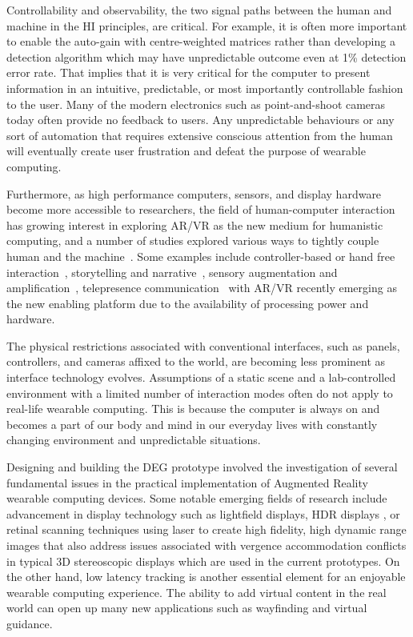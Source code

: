 Controllability and observability, the two signal paths between the human and machine in the HI principles, are critical. For example, it is often more important to enable the auto-gain with centre-weighted matrices rather than developing a detection algorithm which may have unpredictable outcome even at 1\% detection error rate. That implies that it is very critical for the computer to present information in an intuitive, predictable, or most importantly controllable fashion to the user. Many of the modern electronics such as point-and-shoot cameras today often provide no feedback to users. Any unpredictable behaviours or any sort of automation that requires extensive conscious attention from the human will eventually create user frustration and defeat the purpose of wearable computing.

Furthermore, as high performance computers, sensors, and display hardware become more accessible to researchers, the field of human-computer interaction has growing interest in exploring AR/VR as the new medium for humanistic computing, and a number of studies explored various ways to tightly couple human and the machine~\cite{khundam2015first, biocca2013communication, wright2014using, henrikson2016multi}. Some examples include controller-based or hand free interaction~\cite{Arora:vrSketching:2017}, storytelling and narrative~\cite{henrikson2016multi}, sensory augmentation and amplification~\cite{wright2014using}, telepresence communication~\cite{biocca2013communication,earnshaw2014virtual} with AR/VR recently emerging as the new enabling platform due to the availability of processing power and hardware.

The physical restrictions associated with conventional interfaces, such as panels, controllers, and cameras affixed to the world, are becoming less prominent as interface technology evolves. Assumptions of a static scene and a lab-controlled environment with a limited number of interaction modes often do not apply to real-life wearable computing. This is because the computer is always on and becomes a part of our body and mind in our everyday lives with constantly changing environment and unpredictable situations. 

Designing and building the DEG prototype involved the investigation of several fundamental issues in the practical implementation of Augmented Reality wearable computing devices. Some  notable emerging fields of research include advancement in display technology such as lightfield displays\cite{wetzstein2011layered}, HDR displays \cite{reinhard2010high}, or retinal scanning techniques using laser to create high fidelity, high dynamic range images that also address issues associated with vergence accommodation conflicts \cite{takahashi2008stereoscopic} in typical 3D stereoscopic displays which are used in the current prototypes. On the other hand, low latency tracking is another essential element for an enjoyable wearable computing experience. The ability to add virtual content in the real world can open up many new applications such as wayfinding and virtual guidance. 

